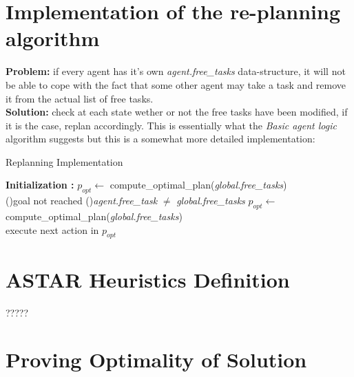 \documentclass[11pt]{article}
\begin{document}
\section{Implementation of the re-planning algorithm}

\textbf{Problem: }if every agent has it's own \emph{agent.free\_tasks} data-structure, it will not be able to cope with the fact that some other agent may take a task and remove it from the actual list of free tasks.\\
\textbf{Solution: }check at each state wether or not the free tasks have been modified, if it is the case, replan accordingly. This is essentially what the \emph{Basic agent logic} algorithm suggests but this is a somewhat more detailed implementation:

\begin{algorithm}
    \SetAlgoLined
    \caption{Replanning Implementation}
    \textbf{Initialization :} $p_{opt}\leftarrow $ compute\_optimal\_plan(\emph{global.free\_tasks})  \\
    \While(){goal not reached}{
        \If(){\emph{agent.free\_task} $\neq$ \emph{global.free\_tasks}}{
            $p_{opt} \leftarrow$ compute\_optimal\_plan(\emph{global.free\_tasks}) \\
        }
        execute next action in $p_{opt}$
    }
\end{algorithm}

\section{ASTAR Heuristics Definition}
?????

\section{Proving Optimality of Solution}
\end{document}
